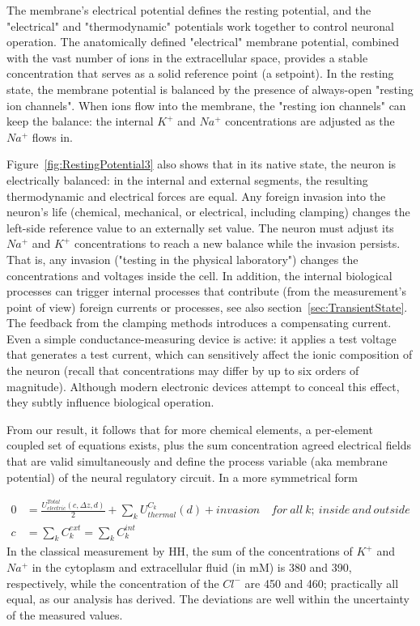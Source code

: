 \fi



\ifx\magyar\undefined
The membrane's electrical potential defines the resting potential, and the "electrical" and "thermodynamic" potentials work together to control neuronal operation.  
The anatomically defined "electrical" membrane potential, combined with the vast number of ions in the extracellular space, provides a stable concentration that serves as a solid reference point (a setpoint).
In the resting state, the membrane potential is balanced by the presence of always-open "resting ion  channels". When ions flow
into the membrane, the "resting ion  channels"
can keep the balance: the internal $K^+$ and $Na^+$ concentrations are adjusted as the $Na^+$ flows in.

Figure~\ref{fig:RestingPotential3} also shows that
in its native state, the neuron is electrically balanced: in the
internal and external segments, the resulting thermodynamic and electrical forces are equal.
Any foreign invasion into the neuron's life (chemical, mechanical, or electrical, including clamping) changes the left-side reference value to
an externally set value. The neuron must adjust its $Na^+$ and $K^+$ concentrations to reach a new balance while the invasion persists. That is, any invasion ("testing in the physical laboratory") changes the concentrations and voltages 
inside the cell. In addition, the internal biological processes can trigger internal processes that contribute (from the measurement's point of view) foreign currents or processes, see also section~\ref{sec:TransientState}. The feedback from the clamping methods introduces a compensating current. Even a simple conductance-measuring device is active: it applies a test voltage that generates a test current, which can sensitively affect the ionic composition of the neuron (recall that concentrations may differ by up to six orders of magnitude). Although modern electronic devices attempt to conceal this effect, they subtly influence biological operation.
\else

\fi

\ifx\magyar\undefined
From our result, it follows that for more chemical elements, a per-element coupled set of equations exists, plus the sum concentration
agreed electrical fields that are valid simultaneously and define the process variable (aka membrane potential) of the neural regulatory circuit.
In a more symmetrical form

\begin{align}
	0 &=\frac{U_{electric}^{Total}(c,\Delta z,d)}{2} + \sum_k U_{thermal}^{C_k}(d) + {invasion}
	\quad for\ all\ k;\ inside\ and\ outside \\
	c &=\sum_k C_k^{ext} =\sum_k C_k^{int}	\label{eq:coupling}
\end{align}
In the classical measurement by \gls{HH}, the sum of the concentrations of $K^+$ and $Na^+$ in the cytoplasm and extracellular fluid  (in mM) is 380 and 390, respectively, while the  concentration of the $Cl^-$ %
are 450 and 460; practically all equal, as our analysis has derived.  The deviations are well within the uncertainty of the 
measured values. 
\else

